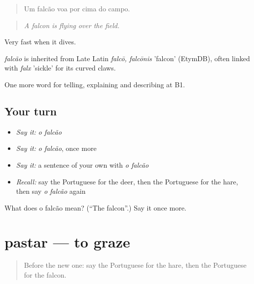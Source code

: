 \begin{quote}
Um falcão voa por cima do campo.
\end{quote}

\begin{quote}
\emph{A falcon is flying over the field.}
\end{quote}

Very fast when it dives.

\begin{cousinweb}
\emph{falcão} is inherited from Late Latin \emph{falcō, falcōnis} 'falcon' (EtymDB), often linked with \emph{falx} 'sickle' for its curved claws.
\end{cousinweb}

\begin{grammarlens}[title={What you've built}]
One more word for telling, explaining and describing at B1.
\end{grammarlens}

\subsection*{Your turn}
\begin{itemize}
\raggedright
  \item \emph{Say it:} \emph{o falcão}
  \item \emph{Say it:} \emph{o falcão}, once more
  \item \emph{Say it:} a sentence of your own with \emph{o falcão}
  \item \emph{Recall:} say the Portuguese for the deer, then the Portuguese for the hare, then say \emph{o falcão} again
\end{itemize}

\begin{tcolorbox}[breakable,colback=teal!4,colframe=teal!35!black,title={Before you move on}]
What does o falcão mean? (\textquotedblleft{}The falcon\textquotedblright{}.) Say it once more.
\end{tcolorbox}
\section[pastar]{pastar — to graze}

\label{lesson:PT-C460-pastar}



\begin{quote}
Before the new one: say the Portuguese for the hare, then the Portuguese for the falcon.
\end{quote}

